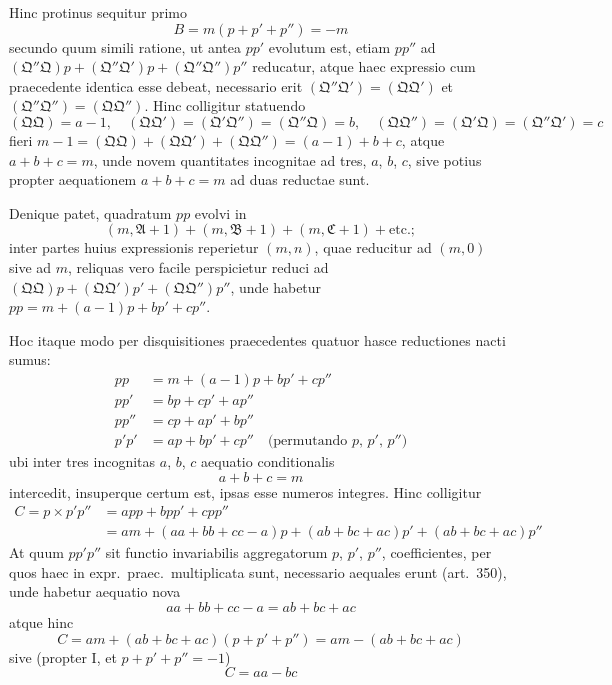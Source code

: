 \documentclass[12pt,a4paper]{article}
\theoremstyle{plain}
\theoremstyle{definition}
\theoremstyle{remark}
\begin{document}
Hinc protinus sequitur primo
\[B = m(p + p' + p'') = -m\]
secundo quum simili ratione, ut antea $pp'$ evolutum est, etiam $pp''$ ad $(\mathfrak{Q}''\mathfrak{Q})p + (\mathfrak{Q}''\mathfrak{Q}')p + (\mathfrak{Q}''\mathfrak{Q}'')p''$ reducatur, atque haec expressio cum praecedente identica esse debeat, necessario erit $(\mathfrak{Q}''\mathfrak{Q}') = (\mathfrak{Q}\mathfrak{Q}')$ et $(\mathfrak{Q}''\mathfrak{Q}'') = (\mathfrak{Q}\mathfrak{Q}'')$. Hinc colligitur statuendo
\[(\mathfrak{Q}\mathfrak{Q}) = a-1, \quad (\mathfrak{Q}\mathfrak{Q}') = (\mathfrak{Q}'\mathfrak{Q}'') = (\mathfrak{Q}''\mathfrak{Q}) = b, \quad (\mathfrak{Q}\mathfrak{Q}'') = (\mathfrak{Q}'\mathfrak{Q}) = (\mathfrak{Q}''\mathfrak{Q}') = c\]
fieri $m-1 = (\mathfrak{Q}\mathfrak{Q}) + (\mathfrak{Q}\mathfrak{Q}') + (\mathfrak{Q}\mathfrak{Q}'') = (a-1) + b + c$, atque $a + b + c = m$, unde novem quantitates incognitae ad tres, $a$, $b$, $c$, sive potius propter aequationem $a + b + c = m$ ad duas reductae sunt.

Denique patet, quadratum $pp$ evolvi in
\[(m, \mathfrak{A}+1) + (m, \mathfrak{B}+1) + (m, \mathfrak{C}+1) + \text{etc.};\]
inter partes huius expressionis reperietur $(m,n)$, quae reducitur ad $(m,0)$ sive ad $m$, reliquas vero facile perspicietur reduci ad $(\mathfrak{Q}\mathfrak{Q})p + (\mathfrak{Q}\mathfrak{Q}')p' + (\mathfrak{Q}\mathfrak{Q}'')p''$, unde habetur $pp = m + (a-1)p + bp' + cp''$.

Hoc itaque modo per disquisitiones praecedentes quatuor hasce reductiones nacti sumus:
\begin{align*}
pp &= m + (a-1)p + bp' + cp'' \\
pp' &= bp + cp' + ap'' \\
pp'' &= cp + ap' + bp'' \\
p'p' &= ap + bp' + cp'' \quad \text{(permutando $p$, $p'$, $p''$)}
\end{align*}
ubi inter tres incognitas $a$, $b$, $c$ aequatio conditionalis
\[a + b + c = m \tag{I}\]
intercedit, insuperque certum est, ipsas esse numeros integres. Hinc colligitur
\begin{align*}
C = p \times p'p'' &= app + bpp' + cpp'' \\
&= am + (aa + bb + cc - a)p + (ab + bc + ac)p' + (ab + bc + ac)p''
\end{align*}
At quum $pp'p''$ sit functio invariabilis aggregatorum $p$, $p'$, $p''$, coefficientes, per quos haec in expr.\ praec.\ multiplicata sunt, necessario aequales erunt (art.\ 350), unde habetur aequatio nova
\[aa + bb + cc - a = ab + bc + ac \tag{II}\]
atque hinc
\[C = am + (ab + bc + ac)(p + p' + p'') = am - (ab + bc + ac)\]
sive (propter I, et $p + p' + p'' = -1$)
\[C = aa - bc \tag{III}\]
\end{document}
